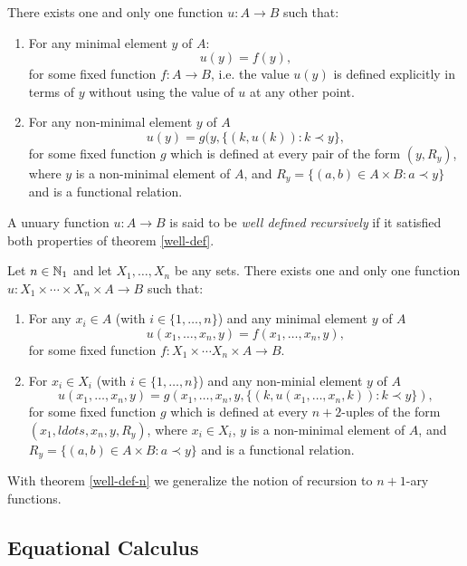 \begin{theorem} \label{well-def}
	There exists one and only one function $u : A \to B$ such that:
	\begin{enumerate}
	\item 
		For any minimal element $y$ of $A$:
		\[ u(y) = f(y), \]
		for some fixed function $f : A \to B$, i.e. the value $u(y)$ is defined explicitly in terms of $y$ without using the value of $u$ at any other point.
	\item
		For any non-minimal element $y$ of $A$
		\[u(y) = g(y, \{(k, u(k)) : k \prec y \}, \]
		for some fixed function $g$ which is defined at every pair of the form $(y, R_y)$, where $y$ is a non-minimal element of $A$, and $R_y = \{ (a,b) \in A \times B : a \prec y \}$
		and is a functional relation.
	\end{enumerate}
\end{theorem}
A unuary function $u : A \to B$ is said to be \emph{well defined recursively} if it satisfied both properties of theorem \ref{well-def}.

\begin{theorem}\label{well-def-n}
	Let $n \in \mathbb{N}_1$ and let $X_1, \ldots, X_n$ be any sets. There exists one and only one function $u: X_1 \times \cdots \times X_n \times A \to B$ such that:
	\begin{enumerate}
		\item For any $x_i \in A$ (with $i \in \{1, \ldots, n\}$) and any minimal element $y$ of $A$
			\[
			u(x_1, \ldots, x_n, y) = f(x_1, \ldots, x_n, y),
			\]
			for some fixed function $f : X_1 \times \cdots X_n \times A \to B$.
		\item
			For $x_i \in X_i$ (with $i \in \{ 1, \ldots, n \}$) and any non-minial element $y$ of $A$
			\[
			u(x_1, \ldots, x_n,y) = g(x_1, \ldots, x_n,y, \{(k, u(x_1, \ldots, x_n,k)) : k \prec y\}),
			\]
			for some fixed function $g$ which is defined at every $n+2$-uples of the form $(x_1, ldots, x_n,y, R_y)$, where $x_i \in X_i$, $y$ is a non-minimal element of $A$, and $R_y = \{ (a,b) \in A \times B : a \prec y \} $ and is a functional relation.
	\end{enumerate}
\end{theorem}
With theorem \ref{well-def-n} we generalize the notion of recursion to $n+1$-ary functions.


\subsection{Equational Calculus}

